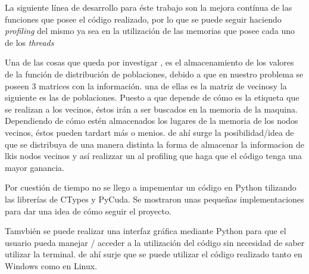 La siguiente línea de desarrollo para éste trabajo son la mejora contínua de las funciones que posee el código realizado, por lo que se puede seguir haciendo \textit{profiling} del mismo ya sea en la utilización de las memorias que posee cada uno de los \textit{threads} 

Una de las cosas que queda por investigar , es el almacenamiento de los valores de la función de distribución de poblaciones, debido a que en nuestro problema se poseen 3 matrices con la información. una de ellas es la matriz de vecinosy la siguiente es las de poblaciones. Puesto a que depende de cómo es la etiqueta que se realizan a los vecinos, éstos irán a ser buscados en la memoria de la maquina. Dependiendo de cómo estén almacenados los lugares de la memoria de los nodos vecinos, éstos pueden tardart más o menios. de ahí surge la posibilidad/idea de que se distribuya de una manera distinta la forma de almacenar la informacion de lkis nodos vecinos y así realizzar un al profiling que haga que el código tenga una mayor ganancia.

Por cuestión de tiempo no se llego a impementar un código en Python tilizando las librerías de CTypes y PyCuda. Se mostraron unas pequeñas implementaciones para dar una idea de cómo seguir el proyecto. 

Tamvbién se puede realizar una interfaz gráfica mediante Python para que el usuario pueda manejar / acceder a la utilización del código sin necesidad de saber utilizar la terminal. de ahí surje que se puede utilizar el código realizado tanto en Windows como en Linux. 